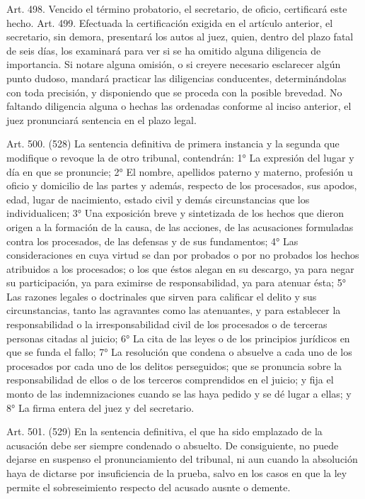     Art. 498. Vencido el término probatorio, el secretario, de oficio, certificará este hecho.
    Art. 499. Efectuada la certificación exigida en el artículo anterior, el secretario, sin demora, presentará los autos al juez, quien, dentro del plazo fatal de seis días, los examinará para ver si se ha omitido alguna diligencia de importancia.
    Si notare alguna omisión, o si creyere necesario esclarecer algún punto dudoso, mandará practicar las diligencias conducentes, determinándolas con toda precisión, y disponiendo que se proceda con la posible brevedad.
    No faltando diligencia alguna o hechas las ordenadas conforme al inciso anterior, el juez pronunciará sentencia en el plazo legal.

    Art. 500. (528) La sentencia definitiva de primera instancia y la segunda que modifique o revoque la de otro tribunal, contendrán:
    1° La expresión del lugar y día en que se pronuncie;
    2° El nombre, apellidos paterno y materno, profesión u oficio y domicilio de las partes y además, respecto de los procesados, sus apodos, edad, lugar de nacimiento, estado civil y demás circunstancias que los individualicen;
    3° Una exposición breve y sintetizada de los hechos que dieron origen a la formación de la causa, de las acciones, de las acusaciones formuladas contra los procesados, de las defensas y de sus fundamentos;
    4° Las consideraciones en cuya virtud se dan por probados o por no probados los hechos atribuidos a los procesados; o los que éstos alegan en su descargo, ya para negar su participación, ya para eximirse de responsabilidad, ya para atenuar ésta;
    5° Las razones legales o doctrinales que sirven para calificar el delito y sus circunstancias, tanto las agravantes como las atenuantes, y para establecer la responsabilidad o la irresponsabilidad civil de los procesados o de terceras personas citadas al juicio;
    6° La cita de las leyes o de los principios jurídicos en que se funda el fallo;
    7° La resolución que condena o absuelve a cada uno de los procesados por cada uno de los delitos perseguidos; que se pronuncia sobre la responsabilidad de ellos o de los terceros comprendidos en el juicio; y fija el monto de las indemnizaciones cuando se las haya pedido y se dé lugar a ellas; y
    8° La firma entera del juez y del secretario.

    Art. 501. (529) En la sentencia definitiva, el que ha sido emplazado de la acusación debe ser siempre condenado o absuelto. De consiguiente, no puede dejarse en suspenso el pronunciamiento del tribunal, ni aun cuando la absolución haya de dictarse por insuficiencia de la prueba, salvo en los casos en que la ley permite el sobreseimiento respecto del acusado ausnte o demente.

